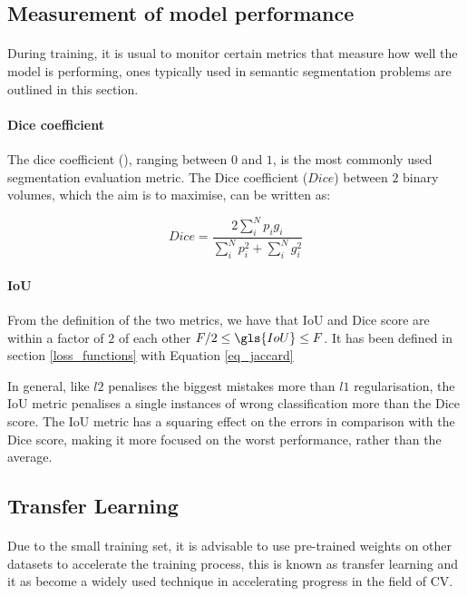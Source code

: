 \subsection{Measurement of model performance} \label{performance_measures}
\paragraph{}
During training, it is usual to monitor certain metrics that measure how well the model is performing, ones typically used in semantic segmentation problems are outlined in this section.
\paragraph{Dice coefficient}
The dice coefficient (\cite{7785132}), ranging between $0$ and $1$, is the most commonly used segmentation evaluation metric. The Dice coefficient ($Dice$) between $2$ binary volumes, which the aim is to maximise, can be written as:

\begin{equation}
    \label{eq_dice_coef}
    Dice=\frac{2\sum_{{i}}^{N}p_{i}g_{i}}{\sum_{i}^{N}p_{i}^{2}+\sum_{i}^{N}g_{{i}}^{2}}
\end{equation}

\paragraph{\gls{IoU}}
From the definition of the two metrics, we have that \gls{IoU} and Dice score are within a factor of $2$ of each other $F/2 \leq \gls{IoU} \leq F$. It has been defined in section \ref{loss_functions} with Equation \ref{eq_jaccard}

In general, like $l2$ penalises the biggest mistakes more than $l1$ regularisation, the \gls{IoU} metric penalises a single instances of wrong classification more than the Dice score. The \gls{IoU} metric has a squaring effect on the errors in comparison with the Dice score, making it more focused on the worst performance, rather than the average.

\subsection{Transfer Learning} \label{transfer_learning}
\paragraph{}
Due to the small training set, it is advisable to use pre-trained weights on other datasets to accelerate the training process, this is known as transfer learning and it as become a widely used technique in accelerating progress in the field of \gls{CV}.

